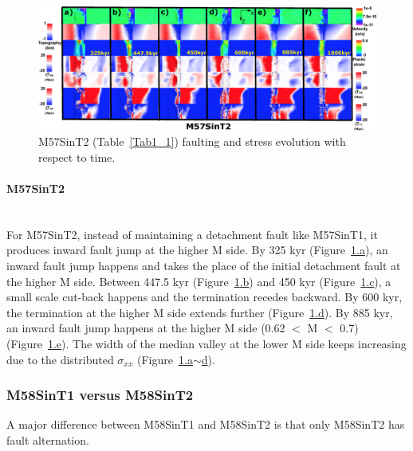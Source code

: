 \begin{figure}[h]
 \centering
  \includegraphics[width=1.0\textwidth]{./Figures/fig_Results_Weakening_4_M57SinT2_time_evolution.eps}
 \caption{M57SinT2 (Table~\hyperref[Tab1_1]{\ref{Tab1_1}}) faulting and stress evolution with respect to time.}
\label{fig_Results_Weakenging_4}
\end{figure}

\paragraph{M57SinT2}\label{para_M57SinT2}
~\\
For M57SinT2, instead of maintaining a detachment fault like M57SinT1, it produces inward fault jump at the higher M side. By 325 kyr (Figure~\hyperref[fig_Results_Weakenging_4]{\ref{fig_Results_Weakenging_4}.a}), an inward fault jump happens and takes the place of the initial detachment fault at the higher M side. Between 447.5 kyr (Figure~\hyperref[fig_Results_Weakenging_4]{\ref{fig_Results_Weakenging_4}.b}) and 450 kyr (Figure~\hyperref[fig_Results_Weakenging_4]{\ref{fig_Results_Weakenging_4}.c}), a small scale cut-back happens and the termination recedes backward. By 600 kyr, the termination at the higher M side extends further (Figure~\hyperref[fig_Results_Weakenging_4]{\ref{fig_Results_Weakenging_4}.d}). By 885 kyr, an inward fault jump happens at the higher M side (0.62 $<$ M $<$ 0.7) (Figure~\hyperref[fig_Results_Weakenging_4]{\ref{fig_Results_Weakenging_4}.e}). The width of the median valley at the lower M side keeps increasing due to the distributed $\sigma_{xx}$ (Figure~\hyperref[fig_Results_Weakenging_4]{\ref{fig_Results_Weakenging_4}.a$\sim$d}).

\subsubsection{M58SinT1 versus M58SinT2}

A major difference between M58SinT1 and M58SinT2 is that only M58SinT2 has fault alternation.

